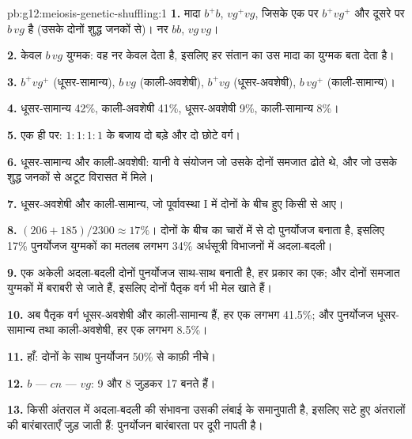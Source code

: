 \begin{solution}{pb:g12:meiosis-genetic-shuffling:1}
\textbf{1.} मादा $b^+b$, $vg^+vg$, जिसके एक  पर $b^+vg^+$ और दूसरे
पर $b\,vg$ है (उसके दोनों शुद्ध जनकों से)। नर $bb$,
$vg\,vg$।

\textbf{2.} केवल $b\,vg$ युग्मक: वह नर केवल   देता है,
इसलिए हर संतान का  उस मादा का युग्मक बता देता है।

\textbf{3.} $b^+vg^+$ (धूसर-सामान्य), $b\,vg$ (काली-अवशेषी),
$b^+vg$ (धूसर-अवशेषी), $b\,vg^+$ (काली-सामान्य)।

\textbf{4.} धूसर-सामान्य 42\%, काली-अवशेषी 41\%, धूसर-अवशेषी 9\%,
काली-सामान्य 8\%।

\textbf{5.} एक ही  पर: $1:1:1:1$ के बजाय दो बड़े और दो छोटे वर्ग।

\textbf{6.} धूसर-सामान्य और काली-अवशेषी: यानी वे संयोजन जो उसके दोनों समजात
ढोते थे, और जो उसके शुद्ध जनकों से अटूट विरासत में मिले।

\textbf{7.} धूसर-अवशेषी और काली-सामान्य, जो पूर्वावस्था I में दोनों  के
बीच हुए किसी  से आए।

\textbf{8.} $(206 + 185)/2300 \approx 17\%$। दोनों  के बीच का
 चारों में से दो  पुनर्योजज बनाता है, इसलिए 17\%
पुनर्योजज युग्मकों का मतलब लगभग 34\% अर्धसूत्री विभाजनों में अदला-बदली।

\textbf{9.} एक अकेली अदला-बदली दोनों पुनर्योजज  साथ-साथ बनाती है,
हर प्रकार का एक; और दोनों समजात युग्मकों में बराबरी से जाते हैं, इसलिए दोनों
पैतृक वर्ग भी मेल खाते हैं।

\textbf{10.} अब पैतृक वर्ग धूसर-अवशेषी और काली-सामान्य हैं, हर एक लगभग
41.5\%; और पुनर्योजज धूसर-सामान्य तथा काली-अवशेषी, हर एक लगभग
8.5\%।

\textbf{11.} हाँ: दोनों के साथ पुनर्योजन 50\% से काफ़ी नीचे।

\textbf{12.} $b$ --- $cn$ --- $vg$: 9 और 8 जुड़कर 17 बनते हैं।

\textbf{13.} किसी अंतराल में अदला-बदली की संभावना उसकी लंबाई के समानुपाती
है, इसलिए सटे हुए अंतरालों की बारंबारताएँ जुड़ जाती हैं: पुनर्योजन
बारंबारता  पर दूरी नापती है।


\end{solution}
